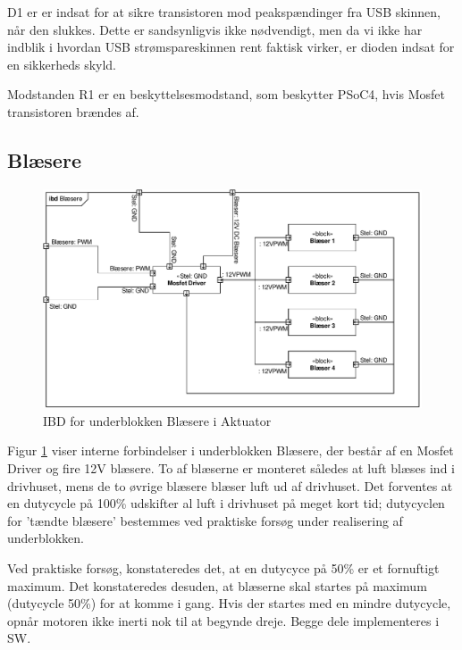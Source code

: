 D1 er er indsat for at sikre transistoren mod peakspændinger fra USB skinnen, når den slukkes. Dette er sandsynligvis ikke nødvendigt, men da vi ikke har indblik i hvordan USB strømspareskinnen rent faktisk virker, er dioden indsat for en sikkerheds skyld. 

Modstanden R1 er en beskyttelsesmodstand, som beskytter PSoC4, hvis Mosfet transistoren brændes af. 

\clearpage

\subsection{Blæsere}

\begin{figure}[h]
\centering 
\includegraphics[width={\textwidth}, trim=0 0 0 0, clip=true] {../fig/ibd_blaesere.pdf}
\caption{IBD for underblokken Blæsere i Aktuator}
\label{fig:ibd_blaesere}
\end{figure}

Figur \ref{fig:ibd_blaesere} viser interne forbindelser i underblokken Blæsere, der består af en Mosfet Driver og fire 12V blæsere. 
To af blæserne er monteret således at luft blæses ind i drivhuset, mens de to øvrige blæsere blæser luft ud af drivhuset. 
Det forventes at en dutycycle på 100\% udskifter al luft i drivhuset på meget kort tid; dutycyclen for 'tændte blæsere' bestemmes ved praktiske forsøg under realisering af underblokken. 

Ved praktiske forsøg, konstateredes det, at en dutycyce på 50\% er et fornuftigt maximum. Det konstateredes desuden, at blæserne skal startes på maximum (dutycycle 50\%) for at komme i gang. 
Hvis der startes med en mindre dutycycle, opnår motoren ikke inerti nok til at begynde dreje. 
Begge dele implementeres i SW. 

